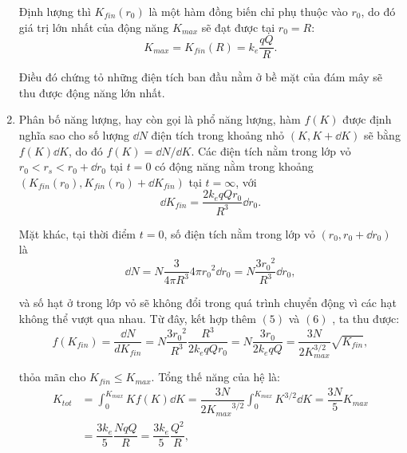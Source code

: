 \begin{loigiai}
\begin{enumerate}[1)]
Định lượng thì $K_{fin}(r_0)$ là một hàm đồng biến chỉ phụ thuộc vào $r_0$, do đó giá trị lớn nhất của động năng $K_{max}$ sẽ đạt được tại $r_0=R$:
   \[ K_{max} = K_{fin}(R) = k_e \dfrac{qQ}{R}. \tag{6} \]

Điều đó chứng tỏ những điện tích ban đầu nằm ở bề mặt của đám mây sẽ thu được động năng lớn nhất. 
 \item Phân bố năng lượng, hay còn gọi là phổ năng lượng, hàm $f(K)$ được định nghĩa sao cho số lượng $\dd N$ điện tích trong khoảng nhỏ $(K, K +\dd K)$ sẽ bằng $f(K)\dd K$, do đó $f(K) = \dd N/\dd K$. Các điện tích nằm trong lớp vỏ $r_0<r_s<r_0 + \dd r_0$ tại $t=0$ có động năng nằm trong khoảng $(K_{fin}(r_0), K_{fin}(r_0) + \dd K_{fin})$ tại $t=\infty$, với
    \[ \dd K_{fin} = \dfrac{2 k_e q Q r_0 }{R^3} \dd r_0 . \tag{7} \] 

Mặt khác, tại thời điểm $t=0$, số điện tích nằm trong lớp vỏ $(r_0, r_0 + \dd r_0)$ là
     \[ \dd N = N \dfrac{3}{4\pi R^3} 4\pi {r_0}^2 \dd r_0 = N \dfrac{3{r_0}^2}{R^3} \dd r_0 , \tag{8} \] 

và số hạt ở trong lớp vỏ sẽ không đổi trong quá trình chuyển động vì các hạt không thể vượt qua nhau. Từ đây, kết hợp thêm $(5)$ và $(6)$ , ta thu được:
    \[ f(K_{fin}) = \dfrac{\dd N}{d K_{fin}} = N \dfrac{3{r_0}^2}{R^3} \dfrac{R^3}{2 k_e q Q r_0} = N \dfrac{3r_0}{2k_e qQ} = \dfrac{3N}{2 K_{max}^{3/2}}\sqrt{K_{fin}} , \tag{9} \]

thỏa mãn cho $K_{fin}\leq K_{max}$.
Tổng thế năng của hệ là:
     \[  \begin{aligned} K_{tot} &= \int_{0}^{K_{max}} K f(K) \dd K = \dfrac{3N}{2{K_{max}}^{3/2}}\int_{0}^{K_{max}} K^{3/2}\dd K = \dfrac{3N}{5} K_{max}\\
              & = \dfrac{3k_e}{5}\dfrac{NqQ}{R} = \dfrac{3k_e }{5} \dfrac{Q^2}{R}, \end{aligned} \tag{10} \]


\end{enumerate}
\end{loigiai}
